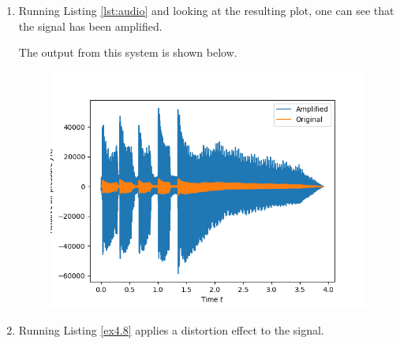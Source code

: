 \begin{enumerate}
\item Running Listing \ref{lst:audio} and looking at the resulting plot, one can see that the signal has been amplified. 

The output from this system is shown below. 
\begin{figure}
\centering
\includegraphics[scale=0.9]{ch04/figures/ex7_plot.png}
\end{figure}

\item Running Listing \ref{ex4.8} applies a distortion effect to the signal. 


\end{enumerate}